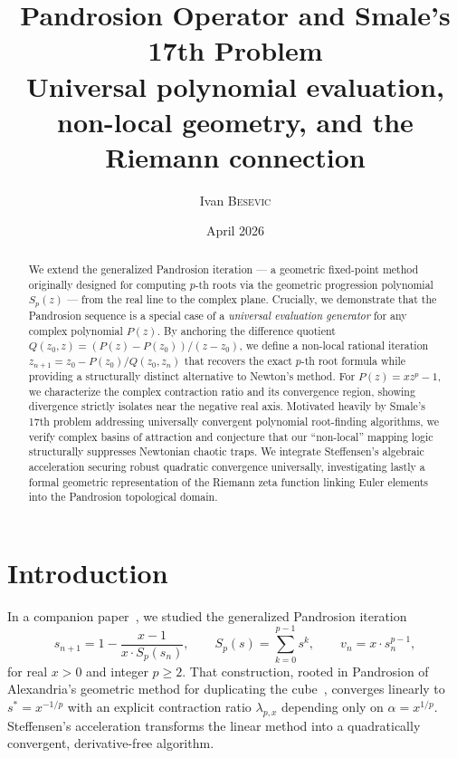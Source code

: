 \documentclass[11pt,a4paper]{article}
\title{\textbf{Pandrosion Operator and Smale's 17th Problem}\\[0.3em]
  \large Universal polynomial evaluation, non-local geometry,
  and the Riemann connection}
\author{Ivan \textsc{Besevic}}
\date{April 2026}
\theoremstyle{definition}
\begin{document}
\maketitle

\begin{abstract}
We extend the generalized Pandrosion iteration --- a geometric fixed-point method originally designed for computing $p$-th roots via the geometric progression polynomial $S_p(z)$ --- from the real line to the complex plane. Crucially, we demonstrate that the Pandrosion sequence is a special case of a \emph{universal evaluation generator} for any complex polynomial $P(z)$. By anchoring the difference quotient $Q(z_0, z) = (P(z) - P(z_0))/(z - z_0)$, we define a non-local rational iteration $z_{n+1} = z_0 - P(z_0)/Q(z_0, z_n)$ that recovers the exact $p$-th root formula while providing a structurally distinct alternative to Newton's method. For $P(z) = xz^p - 1$, we characterize the complex contraction ratio and its convergence region, showing divergence strictly isolates near the negative real axis. Motivated heavily by Smale's 17th problem addressing universally convergent polynomial root-finding algorithms, we verify complex basins of attraction and conjecture that our ``non-local'' mapping logic structurally suppresses Newtonian chaotic traps. We integrate Steffensen's algebraic acceleration securing robust quadratic convergence universally, investigating lastly a formal geometric representation of the Riemann zeta function linking Euler elements into the Pandrosion topological domain.
\end{abstract}

\tableofcontents
\bigskip

\section{Introduction}

In a companion paper~\cite{besevic2026}, we studied the generalized Pandrosion iteration
\begin{equation}
  \label{eq:pandrosion_real}
  s_{n+1} = 1 - \frac{x-1}{x \cdot S_p(s_n)},
  \qquad
  S_p(s) = \sum_{k=0}^{p-1} s^k,
  \qquad
  v_n = x \cdot s_n^{p-1},
\end{equation}
for real $x > 0$ and integer $p \geq 2$.  That construction, rooted in Pandrosion of Alexandria's geometric method for duplicating the cube~\cite{pappus}, converges linearly to $s^* = x^{-1/p}$ with an explicit contraction ratio $\lambda_{p,x}$ depending only on $\alpha = x^{1/p}$.  Steffensen's acceleration transforms the linear method into a quadratically convergent, derivative-free algorithm.
\end{document}
